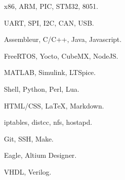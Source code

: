 
        {x86, ARM, PIC, STM32, 8051.}
        {}{}{}{}

        {UART, SPI, I2C, CAN, USB.}
        {}{}{}{}

        {Assembleur, C/C++, Java, Javascript.}
        {}{}{}{}

        {FreeRTOS, Yocto, CubeMX, NodeJS.}
        {}{}{}{}

        {MATLAB, Simulink, LTSpice.}
        {}{}{}{}

        {Shell, Python, Perl, Lua.}
        {}{}{}{}

        {HTML/CSS, {\LaTeX}, Markdown.}
        {}{}{}{}

        {iptables, distcc, nfs, hostapd.}
        {}{}{}{}

        {Git, SSH, Make.}
        {}{}{}{}

        {Eagle, Altium Designer.}
        {}{}{}{}

        {VHDL, Verilog.}
        {}{}{}{}


